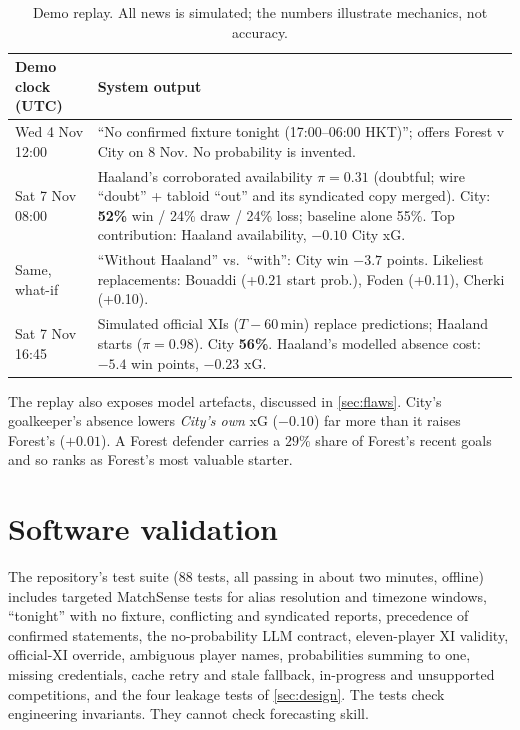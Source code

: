 \documentclass[11pt,a4paper]{article}
\begin{document}
\begin{table}[h]
\centering\small
\begin{tabularx}{\linewidth}{@{}lX@{}}
\toprule
Demo clock (UTC) & System output \\
\midrule
Wed 4 Nov 12:00 & ``No confirmed fixture tonight (17:00--06:00 HKT)''; offers Forest v City on 8 Nov. No probability is invented. \\
Sat 7 Nov 08:00 & Haaland's corroborated availability $\pi=0.31$ (doubtful; wire ``doubt'' + tabloid ``out'' and its syndicated copy merged). City: \textbf{52\%} win / 24\% draw / 24\% loss; baseline alone 55\%. Top contribution: Haaland availability, $-0.10$ City xG. \\
Same, what-if & ``Without Haaland'' vs.\ ``with'': City win $-3.7$ points. Likeliest replacements: Bouaddi (+0.21 start prob.), Foden (+0.11), Cherki (+0.10). \\
Sat 7 Nov 16:45 & Simulated official XIs ($T-60$\,min) replace predictions; Haaland starts ($\pi=0.98$). City \textbf{56\%}. Haaland's modelled absence cost: $-5.4$ win points, $-0.23$ xG. \\
\bottomrule
\end{tabularx}
\caption{Demo replay. All news is simulated; the numbers illustrate mechanics, not accuracy.}
\label{tab:case}
\end{table}

The replay also exposes model artefacts, discussed in \cref{sec:flaws}. City's
goalkeeper's absence lowers \emph{City's own} xG ($-0.10$) far more than it
raises Forest's ($+0.01$). A Forest defender carries a $29\%$ share of Forest's
recent goals and so ranks as Forest's most valuable starter.

\section{Software validation}\label{sec:tests}

The repository's test suite (88 tests, all passing in about two minutes,
offline) includes targeted MatchSense tests for alias resolution and timezone
windows, ``tonight'' with no fixture, conflicting and syndicated reports,
precedence of confirmed statements, the no-probability LLM contract,
eleven-player XI validity, official-XI override, ambiguous player names,
probabilities summing to one, missing credentials, cache retry and stale
fallback, in-progress and unsupported competitions, and the four leakage tests
of \cref{sec:design}. The tests check engineering invariants. They cannot check
forecasting skill.
\end{document}
